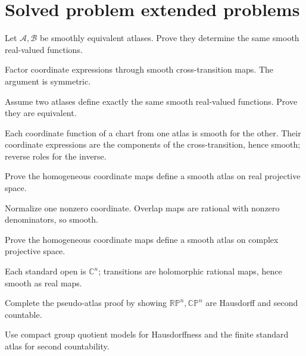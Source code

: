 \section{Solved problem extended problems}
\begin{problem}\label{prob:vii02-01}
Let \(\mathcal A,\mathcal B\) be smoothly equivalent atlases. Prove they determine the same smooth real-valued functions.
\end{problem}
\begin{solution}
Factor coordinate expressions through smooth cross-transition maps. The argument is symmetric.
\end{solution}

\begin{problem}\label{prob:vii02-02}
Assume two atlases define exactly the same smooth real-valued functions. Prove they are equivalent.
\end{problem}
\begin{solution}
Each coordinate function of a chart from one atlas is smooth for the other. Their coordinate expressions are the components of the cross-transition, hence smooth; reverse roles for the inverse.
\end{solution}

\begin{problem}\label{prob:vii02-03}
Prove the homogeneous coordinate maps define a smooth atlas on real projective space.
\end{problem}
\begin{solution}
Normalize one nonzero coordinate. Overlap maps are rational with nonzero denominators, so smooth.
\end{solution}

\begin{problem}\label{prob:vii02-04}
Prove the homogeneous coordinate maps define a smooth atlas on complex projective space.
\end{problem}
\begin{solution}
Each standard open is \(\mathbb C^n\); transitions are holomorphic rational maps, hence smooth as real maps.
\end{solution}

\begin{problem}\label{prob:vii02-05}
Complete the pseudo-atlas proof by showing \(\mathbb{RP}^n,\mathbb{CP}^n\) are Hausdorff and second countable.
\end{problem}
\begin{solution}
Use compact group quotient models for Hausdorffness and the finite standard atlas for second countability.
\end{solution}

